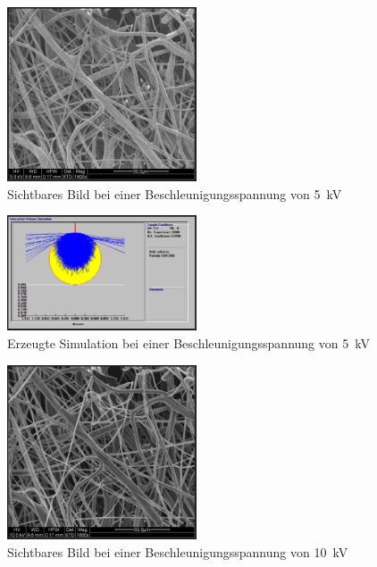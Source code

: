 \documentclass[12pt,english,ngerman]{scrartcl}
\begin{document}

\begin{figure}[H]
	\begin{center}
		\includegraphics[width =0.5\textwidth]{./figures/5kv.png}
	\end{center}
	\caption{Sichtbares Bild bei einer Beschleunigungsspannung von \SI{5}{\kilo\volt}}
    \label{fig:5kv}
\end{figure}

\begin{figure}[H]
	\begin{center}
		\includegraphics[width =0.5\textwidth]{./figures/simulation5kv.png}
	\end{center}
	\caption{Erzeugte Simulation bei einer Beschleunigungsspannung von \SI{5}{\kilo\volt}}
    \label{fig:simulation5kv}
\end{figure}


\begin{figure}[H]
	\begin{center}
		\includegraphics[width =0.5\textwidth]{./figures/10kv.png}
	\end{center}
	\caption{Sichtbares Bild bei einer Beschleunigungsspannung von \SI{10}{\kilo\volt} \cite{sein_foto}}
    \label{fig:10kv}
\end{figure}
\end{document}
